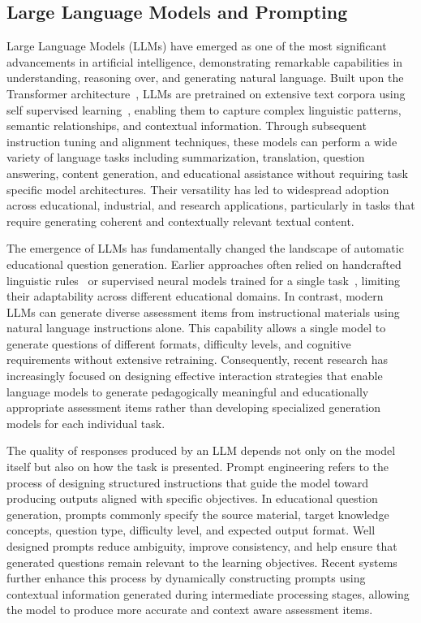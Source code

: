 \subsection{Large Language Models and Prompting}
\label{sec:back-llm}

Large Language Models (LLMs) have emerged as one of the most significant advancements in artificial intelligence, demonstrating remarkable capabilities in understanding, reasoning over, and generating natural language. Built upon the Transformer architecture~\cite{vaswani2017attention}, LLMs are pretrained on extensive text corpora using self supervised learning~\cite{devlin2019bert}, enabling them to capture complex linguistic patterns, semantic relationships, and contextual information. Through subsequent instruction tuning and alignment techniques, these models can perform a wide variety of language tasks including summarization, translation, question answering, content generation, and educational assistance without requiring task specific model architectures. Their versatility has led to widespread adoption across educational, industrial, and research applications, particularly in tasks that require generating coherent and contextually relevant textual content. \cite{eqgbench2025,requesta2026}

The emergence of LLMs has fundamentally changed the landscape of automatic educational question generation. Earlier approaches often relied on handcrafted linguistic rules~\cite{heilman2010goodquestion} or supervised neural models trained for a single task~\cite{du2017learningtoask,zhou2017neuralqg}, limiting their adaptability across different educational domains. In contrast, modern LLMs can generate diverse assessment items from instructional materials using natural language instructions alone. This capability allows a single model to generate questions of different formats, difficulty levels, and cognitive requirements without extensive retraining. Consequently, recent research has increasingly focused on designing effective interaction strategies that enable language models to generate pedagogically meaningful and educationally appropriate assessment items rather than developing specialized generation models for each individual task. \cite{eqgbench2025,requesta2026}

The quality of responses produced by an LLM depends not only on the model itself but also on how the task is presented. Prompt engineering refers to the process of designing structured instructions that guide the model toward producing outputs aligned with specific objectives. In educational question generation, prompts commonly specify the source material, target knowledge concepts, question type, difficulty level, and expected output format. Well designed prompts reduce ambiguity, improve consistency, and help ensure that generated questions remain relevant to the learning objectives. Recent systems further enhance this process by dynamically constructing prompts using contextual information generated during intermediate processing stages, allowing the model to produce more accurate and context aware assessment items. \cite{eqgbench2025,requesta2026}

